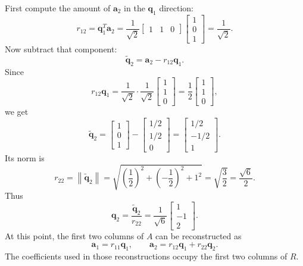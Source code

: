 First compute the amount of \(\mathbf{a}_2\) in the \(\mathbf{q}_1\) direction:
\[
    r_{12}
    =\mathbf{q}_1^T\mathbf{a}_2
    =\frac{1}{\sqrt{2}}
    \begin{bmatrix}
        1 & 1 & 0
    \end{bmatrix}
    \begin{bmatrix}
        1\\0\\1
    \end{bmatrix}
    =\frac{1}{\sqrt{2}}.
\]
Now subtract that component:
\[
    \widetilde{\mathbf{q}}_2
    =\mathbf{a}_2-r_{12}\mathbf{q}_1.
\]
Since
\[
    r_{12}\mathbf{q}_1
    =\frac{1}{\sqrt{2}}\cdot\frac{1}{\sqrt{2}}
    \begin{bmatrix}
        1\\1\\0
    \end{bmatrix}
    =\frac12
    \begin{bmatrix}
        1\\1\\0
    \end{bmatrix},
\]
we get
\[
    \widetilde{\mathbf{q}}_2
    =
    \begin{bmatrix}
        1\\0\\1
    \end{bmatrix}
    -
    \begin{bmatrix}
        1/2\\1/2\\0
    \end{bmatrix}
    =
    \begin{bmatrix}
        1/2\\-1/2\\1
    \end{bmatrix}.
\]
Its norm is
\[
    r_{22}
    =\left\|\widetilde{\mathbf{q}}_2\right\|
    =\sqrt{\left(\frac12\right)^2+\left(-\frac12\right)^2+1^2}
    =\sqrt{\frac32}
    =\frac{\sqrt{6}}{2}.
\]
Thus
\[
    \mathbf{q}_2
    =\frac{\widetilde{\mathbf{q}}_2}{r_{22}}
    =\frac{1}{\sqrt{6}}
    \begin{bmatrix}
        1\\-1\\2
    \end{bmatrix}.
\]
At this point, the first two columns of \(A\) can be reconstructed as
\[
    \mathbf{a}_1=r_{11}\mathbf{q}_1,
    \qquad
    \mathbf{a}_2=r_{12}\mathbf{q}_1+r_{22}\mathbf{q}_2.
\]
The coefficients used in those reconstructions occupy the first two columns of \(R\).

